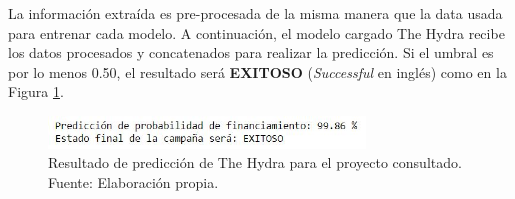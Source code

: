 \newpage
La información extraída es pre-procesada de la misma manera que la data usada para entrenar cada modelo. A continuación, el modelo cargado The Hydra recibe los datos procesados y concatenados para realizar la predicción. Si el umbral es por lo menos 0.50, el resultado será \textbf{EXITOSO} (\textit{Successful} en inglés) como en la Figura \ref{4:fig41}.

\begin{figure}[!ht]
	\begin{center}
		\includegraphics[width=0.75\textwidth]{4/figures/demo_project_prediction.jpg}
		\caption[Resultado de predicción de The Hydra para el proyecto consultado]{Resultado de predicción de The Hydra para el proyecto consultado.\\
			Fuente: Elaboración propia.}
		\label{4:fig41}
	\end{center}
\end{figure}